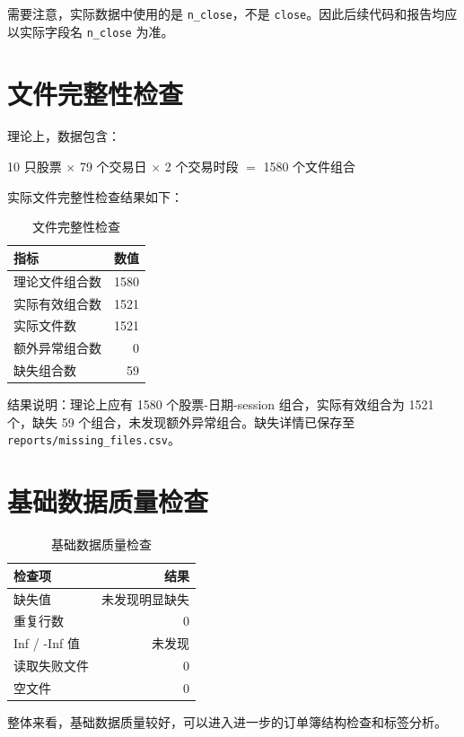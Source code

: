 \documentclass[UTF8,a4paper,12pt]{ctexart}
\begin{document}
需要注意，实际数据中使用的是 \texttt{n\_close}，不是 \texttt{close}。因此后续代码和报告均应以实际字段名 \texttt{n\_close} 为准。

\section{文件完整性检查}

理论上，数据包含：

\begin{center}
10 只股票 $\times$ 79 个交易日 $\times$ 2 个交易时段 $=$ 1580 个文件组合
\end{center}

实际文件完整性检查结果如下：

\begin{table}[H]
\centering
\caption{文件完整性检查}
\begin{tabular}{lr}
\toprule
指标 & 数值 \\
\midrule
理论文件组合数 & 1580 \\
实际有效组合数 & 1521 \\
实际文件数 & 1521 \\
额外异常组合数 & 0 \\
缺失组合数 & 59 \\
\bottomrule
\end{tabular}
\end{table}

结果说明：理论上应有 1580 个股票-日期-session 组合，实际有效组合为 1521 个，缺失 59 个组合，未发现额外异常组合。缺失详情已保存至 \texttt{reports/missing\_files.csv}。

\section{基础数据质量检查}

\begin{table}[H]
\centering
\caption{基础数据质量检查}
\begin{tabular}{lr}
\toprule
检查项 & 结果 \\
\midrule
缺失值 & 未发现明显缺失 \\
重复行数 & 0 \\
Inf / -Inf 值 & 未发现 \\
读取失败文件 & 0 \\
空文件 & 0 \\
\bottomrule
\end{tabular}
\end{table}

整体来看，基础数据质量较好，可以进入进一步的订单簿结构检查和标签分析。
\end{document}
